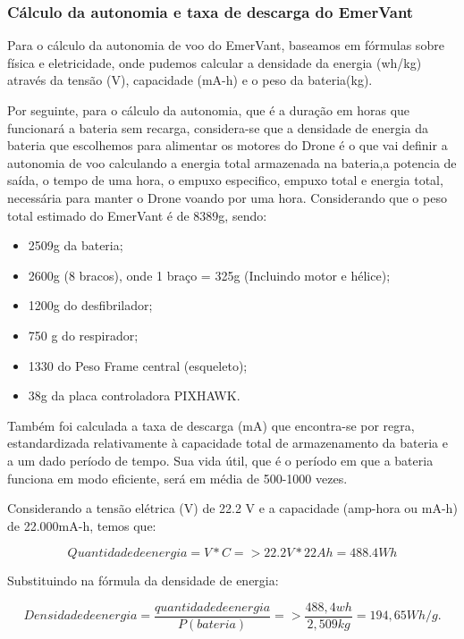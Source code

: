 \subsubsection{Cálculo da autonomia e taxa de descarga do EmerVant}

Para o cálculo da autonomia de voo do EmerVant, baseamos em fórmulas sobre física e eletricidade, onde pudemos calcular a densidade da energia (wh/kg) através da tensão (V), capacidade (mA-h) e o peso da bateria(kg). 

Por seguinte, para o cálculo da autonomia, que é a duração em horas que funcionará a bateria sem recarga, considera-se que a densidade de energia da bateria que escolhemos para alimentar os motores do Drone é o que vai definir a autonomia de voo calculando a energia total armazenada na bateria,a potencia de saída, o tempo de uma hora, o empuxo especifico, empuxo total e energia total, necessária para manter o Drone voando por uma hora. Considerando que o peso total estimado do EmerVant é de 8389g, sendo:

\begin{itemize}
\item 2509g da bateria;
\item 2600g (8 bracos), onde 1 braço = 325g (Incluindo motor e hélice);
\item 1200g do desfibrilador;
\item 750 g do respirador;
\item 1330 do Peso Frame central (esqueleto);
\item 38g da placa controladora PIXHAWK.
\end{itemize}

Também foi calculada a taxa de descarga (mA) que encontra-se por regra, estandardizada relativamente à capacidade total de armazenamento da bateria e a um dado período de tempo. Sua vida útil, que é o período em que a bateria funciona em modo eficiente, será em média de 500-1000 vezes.

Considerando a tensão elétrica (V) de  22.2 V e a capacidade (amp-hora ou mA-h) de 22.000mA-h, temos que: 

\begin{equation}
Quantidade de energia = V*C => 22.2V * 22Ah = 488.4Wh
\end{equation}

Substituindo na fórmula da densidade de energia: 

\begin{equation}
Densidade de energia = \frac{quantidade de energia}{P(bateria)} => \frac{488,4wh}{2,509kg} = 194,65 Wh/g.
\end{equation}

